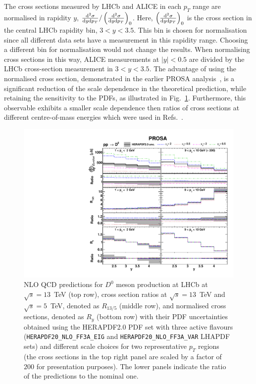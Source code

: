 The cross sections measured by LHCb and ALICE in each $p_T$ range are normalised in rapidity $y$, $\frac{{\rm d}^2\sigma}{{\rm d}y{\rm d}p_T} / \left(\frac{{\rm d}^2\sigma}{{\rm d}y{\rm d}p_T}\right)_{0}$. Here, $\left(\frac{{\rm d}^2\sigma}{{\rm d}y{\rm d}p_T}\right)_{0}$ is the cross section in the central LHCb rapidity bin, $3 < y < 3.5$. 
{\color{blue}This bin is chosen for normalisation since all different data sets have a measurement in this rapidity range.
Choosing a different bin for normalisation would not change the results.}
When normalising cross sections in this way, ALICE measurements at $|y| < 0.5$ are divided by the LHCb cross-section measurement in $3 < y < 3.5$.
The advantage of using the normalised cross section, demonstrated in the earlier PROSA analysis~\cite{Zenaiev:2015rfa}, 
is a significant reduction of the scale dependence in the theoretical prediction,  while retaining the sensitivity to 
the PDFs{\color{magenta}, as illustrated in Fig.~\ref{fig:scalevars}. 
Furthermore, this observable exhibits a smaller scale dependence then ratios of cross sections at different centre-of-mass energies which were used in Refs.~\cite{Gauld:2016kpd,Bertone:2018dse}.}

\begin{figure}
    \centering
    \includegraphics[width=1.00\textwidth]{figs/prosa-scale-vars.pdf}
    \caption{NLO QCD predictions for $D^{0}$ meson production at LHCb at $\sqrt{s} = 13$~TeV (top row), 
      cross section ratios at $\sqrt{s} = 13$~TeV and $\sqrt{s} = 5$~TeV, denoted as $R_{13/5}$ (middle row), and normalised cross sections, denoted as $R_y$ (bottom row) 
      with their PDF uncertainties obtained using the HERAPDF2.0 PDF set with three active flavours (\texttt{HERAPDF20\_NLO\_FF3A\_EIG} and \texttt{HERAPDF20\_NLO\_FF3A\_VAR} LHAPDF sets) and different scale choices for two representative $p_T$ regions 
      (the cross sections in the top right panel are scaled by a factor of $200$ for presentation purposes).
      The lower panels indicate the ratio of the predictions to the nominal one.}
    \label{fig:scalevars}
\end{figure}

